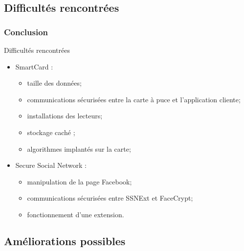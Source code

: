 \documentclass{beamer}
\begin{document}
\subsection{Difficultés rencontrées}
\begin{frame}
    \frametitle{Conclusion}
    \begin{alertblock}{Difficultés rencontrées}
        \begin{itemize}
            \item SmartCard : 
                \begin{itemize}
                    \item taille des données; %
                    \item communications sécurisées entre la carte à puce et l'application
                        cliente;
                    \item installations des lecteurs;
                    \item stockage \og caché \fg{}; %
                    \item algorithmes implantés sur la carte;
                \end{itemize}
            \item Secure Social Network : 
                \begin{itemize}
                    \item manipulation de la page Facebook;
                    \item communications sécurisées entre SSNExt et FaceCrypt;
                    \item fonctionnement d'une extension.
                \end{itemize}
        \end{itemize}
    \end{alertblock}
\end{frame}

\subsection{Améliorations possibles}
\end{document}
